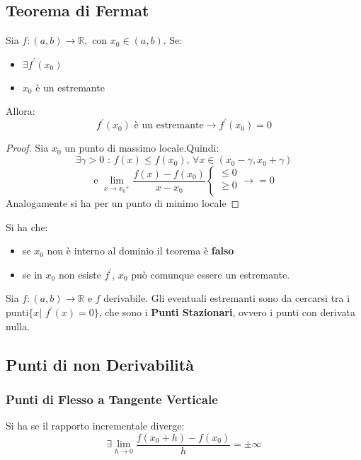 \documentclass[a4paper,12pt, oneside]{book}
\begin{document}
\subsection{Teorema di Fermat}
\begin{teorema}[di Fermat] Sia $f:(a,b)\rightarrow \mathbb{R}, \mbox{ con }
  x_0\in (a,b)$. Se:
  \begin{itemize}
    \item $\exists f^{'}(x_0)$
    \item $x_0$ è un estremante
  \end{itemize} Allora: $$f^{'}(x_0) \mbox{ è un estremante}\rightarrow
  f^{'}(x_0)=0$$
\end{teorema}
\begin{proof} Sia $x_0$ un punto di massimo locale.Quindi: $$\exists\gamma>0
  \mbox{ : } f(x)\leq f(x_0) \mbox{, } \forall x\in (x_0-\gamma, x_0+\gamma)$$
  $$\mbox{e }\lim_{x\rightarrow {x_0}^{+}}\frac{f(x)-f(x_0)}{x-x_0}\left\{
    \begin{array}{ll} \leq0 \\ \geq0 \\
    \end{array} \right.\longrightarrow =0$$ Analogamente si ha per un punto di
  minimo locale
\end{proof}
\begin{shaded}
  \begin{osservazione} Si ha che:
    \begin{itemize}
      \item se $x_0$ non è interno al dominio il teorema è \textbf{falso}
      \item se in $x_0$ non esiste $f^{'}$, $x_0$ può comunque essere un
      estremante.
    \end{itemize}
  \end{osservazione}
  \begin{osservazione} Sia $f:(a,b)\rightarrow\mathbb{R} \mbox{ e } f$
    derivabile. Gli eventuali estremanti sono da cercarsi tra i punti$\{x|\mbox{
    }f^{'}(x)=0\}$, che sono i \textbf{Punti Stazionari}, ovvero i punti con
    derivata nulla.
  \end{osservazione}
\end{shaded}
\subsection{Punti di non Derivabilità}
\subsubsection{Punti di Flesso a Tangente Verticale} Si ha se il rapporto
incrementale diverge:
$$\exists\lim_{h\rightarrow 0} \frac{f(x_0+h)-f(x_0)}{h}=\pm\infty$$
\end{document}
